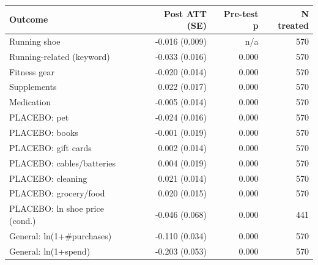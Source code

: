 \begin{tabular}{lrrr}
\toprule
Outcome & Post ATT (SE) & Pre-test p & N treated \\
\midrule
Running shoe & -0.016 (0.009) & n/a & 570 \\
Running-related (keyword) & -0.033 (0.016) & 0.000 & 570 \\
Fitness gear & -0.020 (0.014) & 0.000 & 570 \\
Supplements & 0.022 (0.017) & 0.000 & 570 \\
Medication & -0.005 (0.014) & 0.000 & 570 \\
PLACEBO: pet & -0.024 (0.016) & 0.000 & 570 \\
PLACEBO: books & -0.001 (0.019) & 0.000 & 570 \\
PLACEBO: gift cards & 0.002 (0.014) & 0.000 & 570 \\
PLACEBO: cables/batteries & 0.004 (0.019) & 0.000 & 570 \\
PLACEBO: cleaning & 0.021 (0.014) & 0.000 & 570 \\
PLACEBO: grocery/food & 0.020 (0.015) & 0.000 & 570 \\
PLACEBO: ln shoe price (cond.) & -0.046 (0.068) & 0.000 & 441 \\
General: ln(1+\#purchases) & -0.110 (0.034) & 0.000 & 570 \\
General: ln(1+spend) & -0.203 (0.053) & 0.000 & 570 \\
\bottomrule
\end{tabular}
